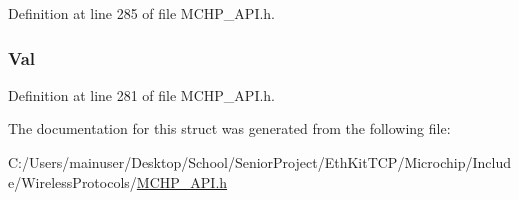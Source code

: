 Definition at line 285 of file M\+C\+H\+P\+\_\+\+A\+P\+I.\+h.

\hypertarget{struct_a_c_t_i_v_e___s_c_a_n___r_e_s_u_l_t_a5ab8c2bf45b20b5f7aa3a4f083896cec}{}
\subsubsection[{Val}]{ Val}\label{struct_a_c_t_i_v_e___s_c_a_n___r_e_s_u_l_t_a5ab8c2bf45b20b5f7aa3a4f083896cec}


Definition at line 281 of file M\+C\+H\+P\+\_\+\+A\+P\+I.\+h.



The documentation for this struct was generated from the following file\+:\begin{DoxyCompactItemize}
\item 
C\+:/\+Users/mainuser/\+Desktop/\+School/\+Senior\+Project/\+Eth\+Kit\+T\+C\+P/\+Microchip/\+Include/\+Wireless\+Protocols/\hyperlink{_m_c_h_p___a_p_i_8h}{M\+C\+H\+P\+\_\+\+A\+P\+I.\+h}\end{DoxyCompactItemize}
